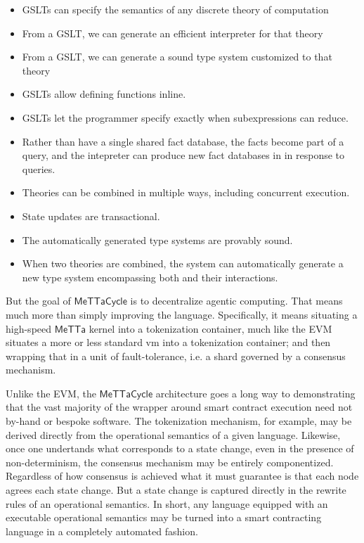 \documentclass{article}
\newcommand{\MC}{\mathsf{MeTTaCycle}}
\begin{document}
\begin{itemize}
    \item GSLTs can specify the semantics of any discrete theory of computation
    \item From a GSLT, we can generate an efficient interpreter for that theory
    \item From a GSLT, we can generate a sound type system customized to that theory
    \item GSLTs allow defining functions inline.
    \item GSLTs let the programmer specify exactly when subexpressions can reduce.
    \item Rather than have a single shared fact database, the facts become part of a query, and the intepreter can produce new fact databases in in response to queries.
    \item Theories can be combined in multiple ways, including concurrent execution.
    \item State updates are transactional.
    \item The automatically generated type systems are provably sound.
    \item When two theories are combined, the system can automatically generate a new type system encompassing both and their interactions.
\end{itemize}

But the goal of $\MC$ is to decentralize agentic computing. That means
much more than simply improving the language. Specifically, it means
situating a high-speed $\mathsf{MeTTa}$ kernel into a tokenization
container, much like the EVM situates a more or less standard vm into
a tokenization container; and then wrapping that in a unit of
fault-tolerance, i.e. a shard governed by a consensus mechanism.

Unlike the EVM, the $\MC$ architecture goes a long way to
demonstrating that the vast majority of the wrapper around smart
contract execution need not by-hand or bespoke software. The
tokenization mechanism, for example, may be derived directly from the
operational semantics of a given language. Likewise, once one
undertands what corresponds to a state change, even in the presence of
non-determinism, the consensus mechanism may be entirely
componentized. Regardless of how consensus is achieved what it must
guarantee is that each node agrees each state change. But a state
change is captured directly in the rewrite rules of an operational
semantics. In short, any language equipped with an executable
operational semantics may be turned into a smart contracting language
in a completely automated fashion.
\end{document}
